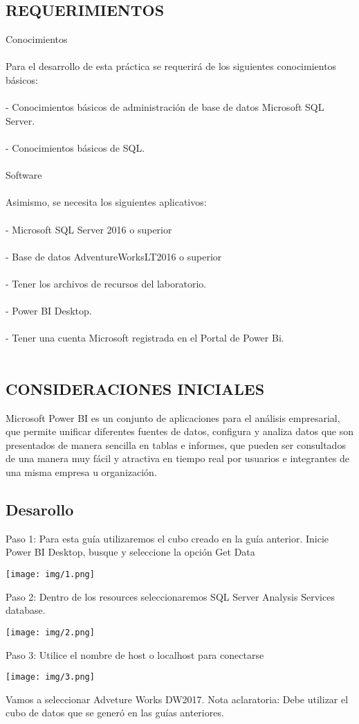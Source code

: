 \documentclass[12pt,letterpaper]{article}
\begin{document}
\subsection*{REQUERIMIENTOS}
Conocimientos \\\\
Para el desarrollo de esta práctica se requerirá de los siguientes conocimientos básicos: 
\\\\
- Conocimientos básicos de administración de base de datos Microsoft SQL Server. 
\\\\
- Conocimientos básicos de SQL.
\\\\
Software \\\\
Asimismo, se necesita los siguientes aplicativos: 
\\\\
- Microsoft SQL Server 2016 o superior 
\\\\
- Base de datos AdventureWorksLT2016 o superior
\\\\
- Tener los archivos de recursos del laboratorio. 
\\\\
- Power BI Desktop. 
\\\\
- Tener una cuenta Microsoft registrada en el Portal de Power Bi. 
\\\\
\subsection*{CONSIDERACIONES INICIALES}
Microsoft Power BI es un conjunto de aplicaciones para el análisis empresarial, que permite unificar diferentes fuentes de datos, configura y analiza datos que son presentados de manera sencilla en tablas e informes, que pueden ser consultados de una manera muy fácil y atractiva en tiempo real por usuarios e integrantes de una misma empresa u organización.

\subsection*{Desarollo}
Paso 1: Para esta guía utilizaremos el cubo creado en la guía anterior. Inicie Power BI Desktop, busque y seleccione la opción Get Data
\begin{center}
    \texttt{[image: img/1.png]}  
\end{center}
Paso 2: Dentro de los resources seleccionaremos SQL Server Analysis Services database.
\begin{center}
    \texttt{[image: img/2.png]}  
\end{center}
Paso 3: Utilice el nombre de host o localhost para conectarse
\begin{center}
    \texttt{[image: img/3.png]}  
\end{center}
Vamos a seleccionar Adveture Works DW2017.
Nota aclaratoria: Debe utilizar el cubo de datos que se generó en las guías anteriores.
\end{document}
